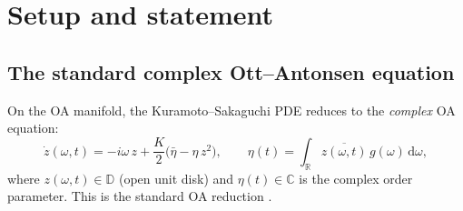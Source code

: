 \documentclass[11pt,a4paper]{article}
\theoremstyle{definition}
\newcommand{\D}{\mathbb{D}}
\newcommand{\R}{\mathbb{R}}
\newcommand{\C}{\mathbb{C}}
\begin{document}
\begin{abstract}
\textbf{Contribution 3: Formalization.} The Lean~4 formalization (Mathlib~\cite{mathlib} v4.30.0-rc1) spans \textbf{260 Lean files} (commit \texttt{7f95a97}); the main theorem \texttt{real\_scalar\_complete} has \textbf{0~\texttt{sorry}} and \textbf{0 project axioms}; the declaration \texttt{real\_scalar\_complete} itself produces no sorry warning (the imported file \texttt{KuramotoGlobal.lean} contains unrelated sorry's in other theorems that are not used by our proof chain). The main theorem \texttt{real\_scalar\_complete} (\textbf{0~sorry, 0~axioms}) proves: for the scalar dissipative mean-field equation~\eqref{eq:oa} with $\gamma > 0$ pointwise, finite first moment $\int\gamma\,g < \infty$, and initial data in the basin $V(0) < (r^*)^2$, the order parameter converges $r(t) \to r^*$. Body persistence is \emph{derived internally}, not assumed. The proof wires: pair bound ($\dot V \leq 0$) $\to$ Cauchy--Schwarz ($r \geq r^* - \sqrt{V(0)} > 0$) $\to$ ODE barrier (body persistence from $r > 0$) $\to$ Barbalat ($V \to 0$) $\to$ convergence ($r \to r^*$). The theorem also requires initial body coherence ($\alpha(\omega,0) \geq \delta_0 > 0$ on $\{\gamma \leq M\}$ for each $M$), which holds for initial data pointwise close to the PLS on each $\{\gamma \leq M\}$ (an $L^\infty$-type condition, not implied by $L^2(g)$ proximity alone). When $\gamma(\omega) \lesssim 1 + |\omega|$, this includes Gaussian, compactly supported, Student-$t$ ($\nu > 1$), and mixtures satisfying the same first-moment bound. To our knowledge, this is the first fully self-contained, machine-checked stability theorem for any Kuramoto-type model.
\end{abstract}

\tableofcontents

\section{Setup and statement}

\subsection{The standard complex Ott--Antonsen equation}\label{sec:complex-oa}

On the OA manifold, the Kuramoto--Sakaguchi PDE reduces to the \emph{complex} OA equation:
\begin{equation}\label{eq:complex-oa}
\dot{z}(\omega,t) = -i\omega\,z + \frac{K}{2}\bigl(\bar\eta - \eta\,z^2\bigr), \qquad \eta(t) = \int_\R \overline{z(\omega,t)}\,g(\omega)\,\mathrm{d}\omega,
\end{equation}
where $z(\omega,t) \in \D$ (open unit disk) and $\eta(t) \in \C$ is the complex order parameter. This is the standard OA reduction \cite{ott-antonsen2008}.
\end{document}
